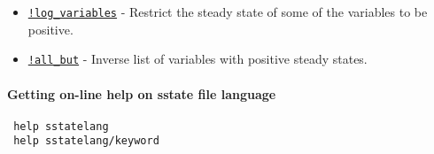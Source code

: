  \begin{itemize}
 \item
   \href{sstatelang/logvariables}{\texttt{!log\_variables}} - Restrict
   the steady state of some of the variables to be positive.
 \item
   \href{sstatelang/allbut}{\texttt{!all\_but}} - Inverse list of
   variables with positive steady states.
 \end{itemize}
 
 \paragraph{Getting on-line help on sstate file language}
 
 \begin{verbatim}
 help sstatelang
 help sstatelang/keyword
 \end{verbatim}




